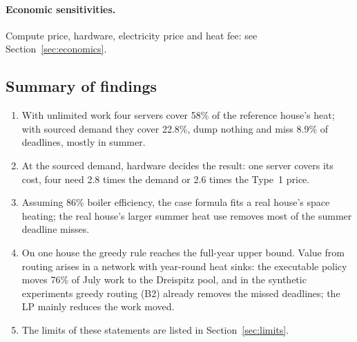 \paragraph{Economic sensitivities.} Compute price, hardware, electricity price and heat fee: see
Section~\ref{sec:economics}.

\subsection{Summary of findings}

\begin{enumerate}
  \item[(i)] With unlimited work four servers cover 58\% of the reference house's heat; with sourced
    demand they cover 22.8\%, dump nothing and miss 8.9\% of deadlines, mostly in summer.
  \item[(ii)] At the sourced demand, hardware decides the result: one server covers its cost,
    four need 2.8 times the demand or 2.6 times the Type~1 price.
  \item[(iii)] Assuming 86\% boiler efficiency, the case formula fits a real house's space heating; the real house's larger summer
    heat use removes most of the summer deadline misses.
  \item[(iv)] On one house the greedy rule reaches the full-year upper bound. Value from routing
    arises in a network with year-round heat sinks: the executable policy moves 76\% of July work
    to the Dreispitz pool, and in the synthetic experiments greedy routing (B2) already removes the
    missed deadlines; the LP mainly reduces the work moved.
  \item[(v)] The limits of these statements are listed in Section~\ref{sec:limits}.
\end{enumerate}
